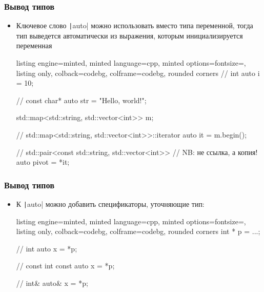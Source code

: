 \documentclass[10pt]{beamer}
\begin{document}
\begin{frame}[fragile]
\frametitle{Вывод типов}
\begin{itemize}
\item Ключевое слово \texttt|auto| можно использовать вместо типа переменной, тогда тип выведется автоматически из выражения, которым инициализируется переменная
\pause
{}
\begin{tcblisting}{listing engine=minted, minted language=cpp, minted options={fontsize=\scriptsize}, listing only, colback=codebg, colframe=codebg, rounded corners}
// int
auto i = 10;

// const char*
auto str = "Hello, world!";

std::map<std::string, std::vector<int>> m;

// std::map<std::string, std::vector<int>>::iterator
auto it = m.begin();

// std::pair<const std::string, std::vector<int>>
// NB: не ссылка, а копия!
auto pivot = *it;
\end{tcblisting}
\end{itemize}
\end{frame}

\begin{frame}[fragile]
\frametitle{Вывод типов}
\begin{itemize}
\item К \texttt|auto| можно добавить спецификаторы, уточняющие тип:
\pause
{}
\begin{tcblisting}{listing engine=minted, minted language=cpp, minted options={fontsize=\scriptsize}, listing only, colback=codebg, colframe=codebg, rounded corners}
int * p = ...;

// int
auto x = *p;

// const int
const auto x = *p;

// int&
auto& x = *p;
\end{tcblisting}
\end{itemize}
\end{frame}
\end{document}
